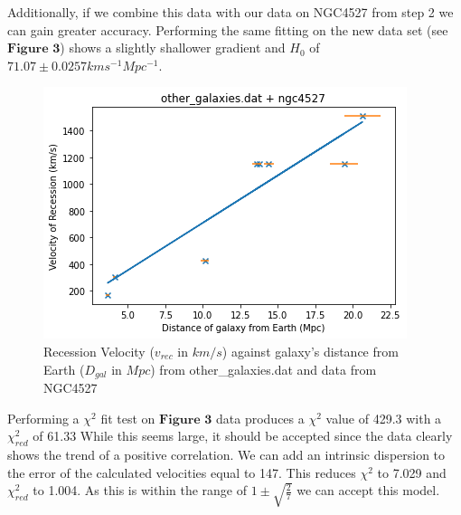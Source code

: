 \documentclass{article}
\begin{document}
    \newline
    \newline
    Additionally, if we combine this data with our data on NGC4527 from step 2 we can gain greater accuracy. Performing the same fitting on the new data set (see $\textbf{Figure 3}$)
    shows a slightly shallower gradient and $H_0$ of $71.07 \pm 0.0257 kms^{-1}Mpc^{-1}$.
    \begin{figure}
        \centering
        \includegraphics[scale = 0.7]{../media/images/part3.1.png}
        \caption{Recession Velocity ($v_{rec}$ in $km/s$) against galaxy's distance from Earth ($D_{gal}$ in $Mpc$) from other\_galaxies.dat and data from NGC4527}
    \end{figure}
    \newline 
    \newline 
    Performing a $\chi^2$ fit test on $\textbf{Figure 3}$ data produces a $\chi^2$ value of 429.3 with a $\chi^2_{red}$ of 61.33
    While this seems large, it should be accepted since the data clearly shows the trend of a positive correlation. We can add an intrinsic dispersion to the error of the calculated velocities equal to 147.
    This reduces $\chi^2$ to 7.029 and $\chi^2_{red}$ to 1.004. As this is within the range of $1\pm\sqrt{\frac{2}{7}}$ we can accept this model.
\end{document}
